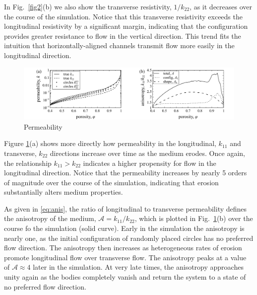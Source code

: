 \documentclass[3p]{elsarticle}
\newcommand{\anis}{\mathcal{A}}
\begin{document}
In Fig.~\ref{fig2}(b) we also show the transverse resistivity, $1/k_{22}$, as it decreases over the course of the simulation. Notice that this transverse resistivity exceeds the longitudinal resistivity by a significant margin, indicating that the configuration provides greater resistance to flow in the vertical direction. This trend fits the intuition that horizontally-aligned channels transmit flow more easily in the longitudinal direction.

\begin{figure}%
\centering
\includegraphics[width = 0.99 \textwidth]{./figs/fig3.pdf}
\caption{
Permeability
\label{fig3}
}
\end{figure}

Figure \ref{fig3}(a) shows more directly how permeability in the longitudinal, $k_{11}$ and transverse, $k_{22}$ directions increase over time as the medium erodes. Once again, the relationship $k_{11} > k_{22}$ indicates a higher propensity for flow in the longitudinal direction. Notice that the permeability increases by nearly 5 orders of magnitude over the course of the simulation, indicating that erosion substantially alters medium properties.

As given in \eqref{eq:anis}, the ratio of longitudinal to transverse permeability defines the anisotropy of the medium, $\anis = k_{11} / k_{22}$, which is plotted in Fig.~\ref{fig3}(b) over the course fo the simulation (solid curve). Early in the simulation the anisotropy is nearly one, as the initial configuration of randomly placed circles has no preferred flow direction. The anisotropy then increases as heterogeneous rates of erosion promote longitudinal flow over transverse flow. The anisotropy peaks at a value of $\anis \approx 4$ later in the simulation. At very late times, the anisotropy approaches unity again as the bodies completely vanish and return the system to a state of no preferred flow direction.
\end{document}
